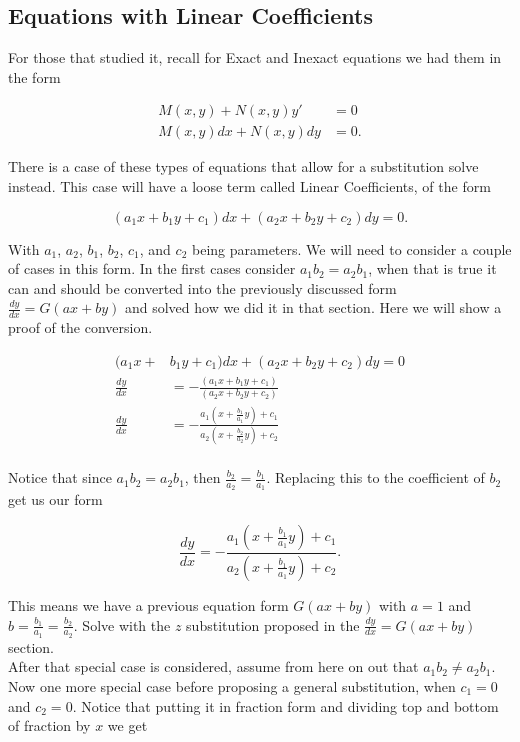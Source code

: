 \documentclass[12pt]{article}
\begin{document}
\subsection{Equations with Linear Coefficients}

For those that studied it, recall for Exact and Inexact equations we had them in the form

\begin{align*}
    M(x,y)+N(x,y)y' &= 0 \\
    M(x,y)dx+N(x,y)dy &= 0.
\end{align*}

There is a case of these types of equations that allow for a substitution solve instead. This case will have a loose term called Linear Coefficients, of the form

\begin{equation*}
    (a_1x+b_1y+c_1)dx+(a_2x+b_2y+c_2)dy=0.
\end{equation*}

With $a_1$, $a_2$, $b_1$, $b_2$, $c_1$, and $c_2$ being parameters. We will need to consider a couple of cases in this form. In the first cases consider $a_1b_2=a_2b_1$, when that is true it can and should be converted into the previously discussed form $\frac{dy}{dx} = G(ax+by)$ and solved how we did it in that section. Here we will show a proof of the conversion.

\begin{align*}
    (a_1x+&b_1y+c_1)dx+(a_2x+b_2y+c_2)dy = 0 \\
    \frac{dy}{dx} &= -\frac{(a_1x+b_1y+c_1)}{(a_2x+b_2y+c_2)} \\
    \frac{dy}{dx} &= -\frac{a_1(x+\frac{b_1}{a_1}y)+c_1}{a_2(x+\frac{b_2}{a_2}y)+c_2} \\
\end{align*}

Notice that since $a_1b_2=a_2b_1$, then $\frac{b_2}{a_2}=\frac{b_1}{a_1}$. Replacing this to the coefficient of $b_2$ get us our form

\begin{equation*}
    \frac{dy}{dx} = -\frac{a_1(x+\frac{b_1}{a_1}y)+c_1}{a_2(x+\frac{b_1}{a_1}y)+c_2}.
\end{equation*}

This means we have a previous equation form $G(ax+by)$ with $a=1$ and $b=\frac{b_1}{a_1}=\frac{b_2}{a_2}$. Solve with the $z$ substitution proposed in the $\frac{dy}{dx} = G(ax+by)$ section. \\

After that special case is considered, assume from here on out that $a_1b_2 \neq a_2b_1$. Now one more special case before proposing a general substitution, when $c_1=0$ and $c_2=0$. Notice that putting it in fraction form and dividing top and bottom of fraction by $x$ we get
\end{document}
